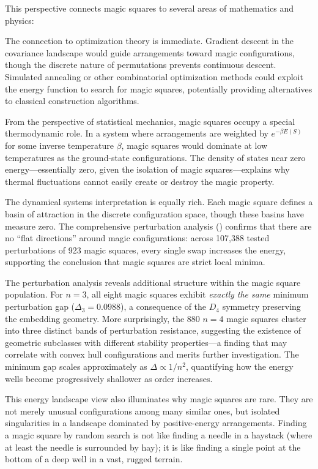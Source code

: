 This perspective connects magic squares to several areas of mathematics and physics:

The connection to optimization theory is immediate.
Gradient descent in the covariance landscape would guide arrangements toward magic configurations,
though the discrete nature of permutations prevents continuous descent.
Simulated annealing or other combinatorial optimization methods could exploit the energy function
to search for magic squares, potentially providing alternatives to classical construction algorithms.

From the perspective of statistical mechanics, magic squares occupy a special thermodynamic role.
In a system where arrangements are weighted by $e^{-\beta E(S)}$ for some inverse temperature $\beta$,
magic squares would dominate at low temperatures as the ground-state configurations.
The density of states near zero energy---essentially zero, given the isolation of magic squares---explains 
why thermal fluctuations cannot easily create or destroy the magic property.

The dynamical systems interpretation is equally rich.
Each magic square defines a basin of attraction in the discrete configuration space,
though these basins have measure zero.
The comprehensive perturbation analysis () confirms that 
there are no ``flat directions'' around magic configurations:
across 107,388 tested perturbations of 923 magic squares,
every single swap increases the energy, supporting the conclusion that magic squares are strict local minima.

The perturbation analysis reveals additional structure within the magic square population.
For $n=3$, all eight magic squares exhibit \emph{exactly the same} minimum perturbation gap 
($\Delta_3 = 0.0988$), a consequence of the $D_4$ symmetry preserving the embedding geometry.
More surprisingly, the 880 $n=4$ magic squares cluster into three distinct bands 
of perturbation resistance, suggesting the existence of geometric subclasses 
with different stability properties---a finding that may correlate 
with convex hull configurations and merits further investigation.
The minimum gap scales approximately as $\Delta \propto 1/n^2$,
quantifying how the energy wells become progressively shallower as order increases.

This energy landscape view also illuminates why magic squares are rare.
They are not merely unusual configurations among many similar ones, but isolated singularities 
in a landscape dominated by positive-energy arrangements.
Finding a magic square by random search is not like finding a needle in a haystack 
(where at least the needle is surrounded by hay);
it is like finding a single point at the bottom of a deep well in a vast, rugged terrain.

